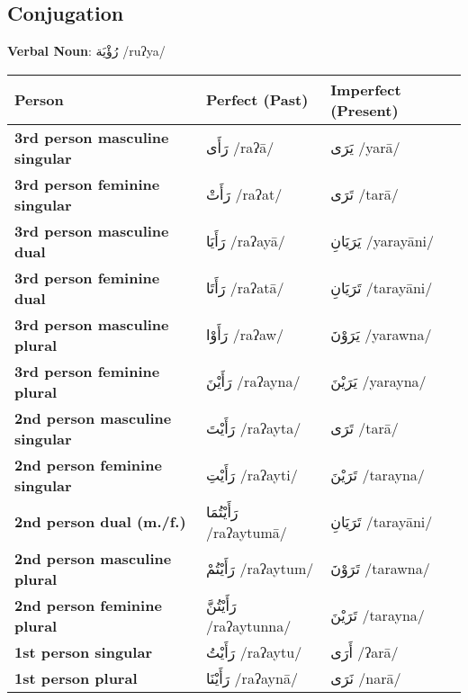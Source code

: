 \documentclass[letterpaper,12pt]{article}
\begin{document}
\subsection{Conjugation}

\par{ \large \textbf{Verbal Noun}: \textarabic{رُؤْيَة} /ruʔya/}

\begin{longtable}{|>{\raggedright}p{3.5cm}|p{5cm}|p{5cm}|}
\hline
\textbf{Person} & \textbf{Perfect (Past)} & \textbf{Imperfect (Present)} \\
\hline
\textbf{3rd person masculine singular} & \textarabic{رَأَى} /raʔā/ & \textarabic{يَرَى} /yarā/ \\
\hline
\textbf{3rd person feminine singular} & \textarabic{رَأَتْ} /raʔat/ & \textarabic{تَرَى} /tarā/ \\
\hline
\textbf{3rd person masculine dual} & \textarabic{رَأَيَا} /raʔayā/ & \textarabic{يَرَيَانِ} /yarayāni/ \\
\hline
\textbf{3rd person feminine dual} & \textarabic{رَأَتَا} /raʔatā/ & \textarabic{تَرَيَانِ} /tarayāni/ \\
\hline
\textbf{3rd person masculine plural} & \textarabic{رَأَوْا} /raʔaw/ & \textarabic{يَرَوْنَ} /yarawna/ \\
\hline
\textbf{3rd person feminine plural} & \textarabic{رَأَيْنَ} /raʔayna/ & \textarabic{يَرَيْنَ} /yarayna/ \\
\hline
\textbf{2nd person masculine singular} & \textarabic{رَأَيْتَ} /raʔayta/ & \textarabic{تَرَى} /tarā/ \\
\hline
\textbf{2nd person feminine singular} & \textarabic{رَأَيْتِ} /raʔayti/ & \textarabic{تَرَيْنَ} /tarayna/ \\
\hline
\textbf{2nd person dual (m./f.)} & \textarabic{رَأَيْتُمَا} /raʔaytumā/ & \textarabic{تَرَيَانِ} /tarayāni/ \\
\hline
\textbf{2nd person masculine plural} & \textarabic{رَأَيْتُمْ} /raʔaytum/ & \textarabic{تَرَوْنَ} /tarawna/ \\
\hline
\textbf{2nd person feminine plural} & \textarabic{رَأَيْتُنَّ} /raʔaytunna/ & \textarabic{تَرَيْنَ} /tarayna/ \\
\hline
\textbf{1st person singular} & \textarabic{رَأَيْتُ} /raʔaytu/ & \textarabic{أَرَى} /ʔarā/ \\
\hline
\textbf{1st person plural} & \textarabic{رَأَيْنَا} /raʔaynā/ & \textarabic{نَرَى} /narā/ \\
\hline
\end{longtable}
\end{document}
